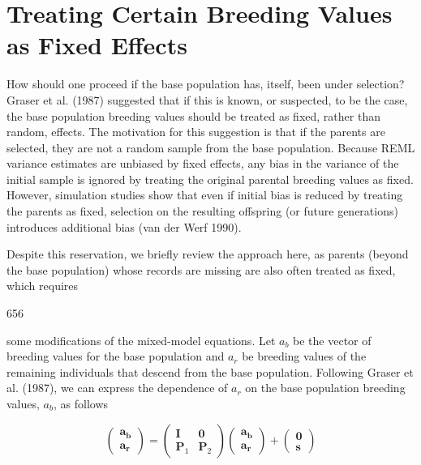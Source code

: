 \documentclass{article}
\begin{document}
\section{Treating Certain Breeding Values as Fixed Effects}
How should one proceed if the base population has, itself, been under selection? Graser et al. (1987) suggested that if this is known, or suspected, to be the case, the base population breeding values should be treated as fixed, rather than random, effects. The motivation for this suggestion is that if the parents are selected, they are not a random sample from the base population. Because REML variance estimates are unbiased by fixed effects, any bias in the variance of the initial sample is ignored by treating the original parental breeding values as fixed. However, simulation studies show that even if initial bias is reduced by treating the parents as fixed, selection on the resulting offspring (or future generations) introduces additional bias (van der Werf 1990).

Despite this reservation, we briefly review the approach here, as parents (beyond the base population) whose records are missing are also often treated as fixed, which requires

656

some modifications of the mixed-model equations. Let  $ a_{b} $ be the vector of breeding values for the base population and  $ a_{r} $ be breeding values of the remaining individuals that descend from the base population. Following Graser et al. (1987), we can express the dependence of  $ a_{r} $ on the base population breeding values,  $ a_{b} $, as follows

\begin{equation}
\begin{pmatrix}\mathbf{a}_{\mathbf{b}}\\\mathbf{a}_{\mathbf{r}}\end{pmatrix}=\begin{pmatrix}\mathbf{I}&\mathbf{0}\\\mathbf{P}_{1}&\mathbf{P}_{2}\end{pmatrix}\begin{pmatrix}\mathbf{a}_{\mathbf{b}}\\\mathbf{a}_{\mathbf{r}}\end{pmatrix}+\begin{pmatrix}\mathbf{0}\\\mathbf{s}\end{pmatrix}
\tag{19.22}
\label{eq:19_22}
\end{equation}
\end{document}
